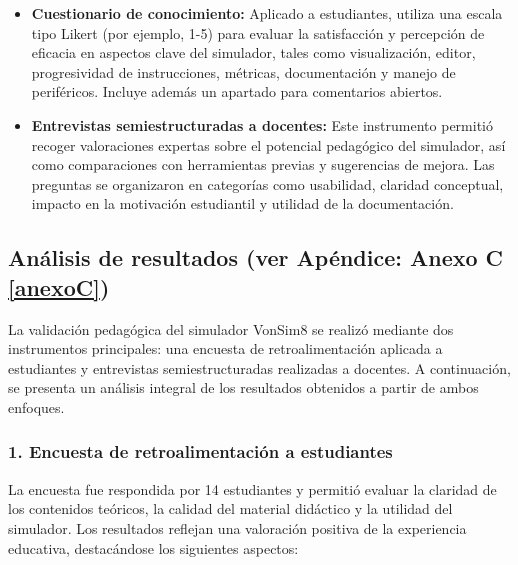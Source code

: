 \documentclass[12pt,oneside]{templates/unerthesis}
\begin{document}
\begin{itemize}
\item
  \textbf{Cuestionario de conocimiento:} Aplicado a estudiantes, utiliza una escala tipo Likert (por ejemplo, 1-5) para evaluar la satisfacción y percepción de eficacia en aspectos clave del simulador, tales como visualización, editor, progresividad de instrucciones, métricas, documentación y manejo de periféricos. Incluye además un apartado para comentarios abiertos.
\item
  \textbf{Entrevistas semiestructuradas a docentes:} Este instrumento permitió recoger valoraciones expertas sobre el potencial pedagógico del simulador, así como comparaciones con herramientas previas y sugerencias de mejora. Las preguntas se organizaron en categorías como usabilidad, claridad conceptual, impacto en la motivación estudiantil y utilidad de la documentación.
\end{itemize}

\hypertarget{anuxe1lisis-de-resultados-ver-apuxe9ndice-anexo-c-refanexoc}{%
\subsection{Análisis de resultados (ver Apéndice: Anexo C \ref{anexoC})}\label{anuxe1lisis-de-resultados-ver-apuxe9ndice-anexo-c-refanexoc}}

La validación pedagógica del simulador VonSim8 se realizó mediante dos instrumentos principales: una encuesta de retroalimentación aplicada a estudiantes y entrevistas semiestructuradas realizadas a docentes. A continuación, se presenta un análisis integral de los resultados obtenidos a partir de ambos enfoques.

\hypertarget{encuesta-de-retroalimentaciuxf3n-a-estudiantes}{%
\subsubsection{1. Encuesta de retroalimentación a estudiantes}\label{encuesta-de-retroalimentaciuxf3n-a-estudiantes}}

La encuesta fue respondida por 14 estudiantes y permitió evaluar la claridad de los contenidos teóricos, la calidad del material didáctico y la utilidad del simulador. Los resultados reflejan una valoración positiva de la experiencia educativa, destacándose los siguientes aspectos:
\end{document}
